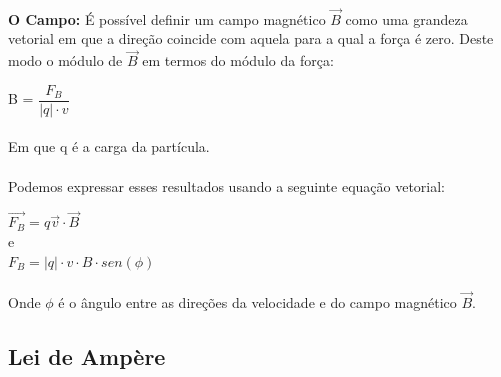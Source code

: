 \documentclass[a4paper, 12pt]{article}
\begin{document}
\paragraph{}\textbf{O Campo:} É possível definir um campo magnético $\overrightarrow{B}$ como uma grandeza vetorial em que a direção coincide com aquela para a qual a força é zero. Deste modo o módulo de $\overrightarrow{B}$ em termos do módulo da força:
\\
\begin{mdframed}[backgroundcolor=gray!20]
\begin{center}
	B = $\dfrac{F_B}{|q|\cdot v}$
			\end{center}
\end{mdframed}

\paragraph{}Em que q é a carga da partícula.

\paragraph{}Podemos expressar esses resultados usando a seguinte equação vetorial: \\
\begin{mdframed}[backgroundcolor=gray!20]
\begin{center}
	$\overrightarrow{F_B} = q\overrightarrow{v} \cdot \overrightarrow{B}$
    \\e\\
    $F_B = |q| \cdot v \cdot B \cdot sen(\phi)$
			\end{center}
\end{mdframed}

\paragraph{}Onde $\phi$ é o ângulo entre as direções da velocidade e do campo magnético $\overrightarrow{B}$.

\subsection{Lei de Ampère}
\end{document}
